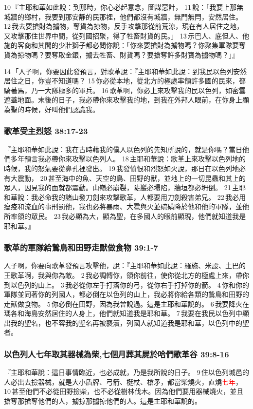 10 『主耶和華如此說：到那時，你心必起意念，圖謀惡計， 11 說：「我要上那無城牆的鄉村，我要到那安靜的民那裡，他們都沒有城牆，無門無閂，安然居住。 12 我去要搶財為擄物，奪貨為掠物，反手攻擊那從前荒涼，現在有人居住之地，又攻擊那住世界中間，從列國招聚，得了牲畜財貨的民。」 13 示巴人、底但人、他施的客商和其間的少壯獅子都必問你說：「你來要搶財為擄物嗎？你聚集軍隊要奪貨為掠物嗎？要奪取金銀，擄去牲畜、財貨嗎？要搶奪許多財寶為擄物嗎？」』

14 「人子啊，你要因此發預言，對歌革說：『主耶和華如此說：到我民以色列安然居住之日，你豈不知道嗎？ 15 你必從本地，從北方的極處率領許多國的民來，都騎著馬，乃一大隊極多的軍兵。 16 歌革啊，你必上來攻擊我的民以色列，如密雲遮蓋地面。末後的日子，我必帶你來攻擊我的地，到我在外邦人眼前，在你身上顯為聖的時候，好叫他們認識我。

\subsubsection{歌革受主烈怒 38:17-23}
『主耶和華如此說：我在古時藉我的僕人以色列的先知所說的，就是你嗎？當日他們多年預言我必帶你來攻擊以色列人。 18 主耶和華說：歌革上來攻擊以色列地的時候，我的怒氣要從鼻孔裡發出。 19 我發憤恨和烈怒如火說，那日在以色列地必有大震動， 20 甚至海中的魚、天空的鳥、田野的獸，並地上的一切昆蟲和其上的眾人，因見我的面就都震動。山嶺必崩裂，陡巖必塌陷，牆垣都必坍倒。 21 主耶和華說：我必命我的諸山發刀劍來攻擊歌革，人都要用刀劍殺害弟兄。 22 我必用瘟疫和流血的事刑罰他，我也必將暴雨、大雹與火並硫磺降於他和他的軍隊，並他所率領的眾民。 23 我必顯為大，顯為聖，在多國人的眼前顯現，他們就知道我是耶和華。』


\subsubsection{歌革的軍隊給鷙鳥和田野走獸做食物 39:1-7}
人子啊，你要向歌革發預言攻擊他，說：『主耶和華如此說：羅施、米設、土巴的王歌革啊，我與你為敵。 2 我必調轉你，領你前往，使你從北方的極處上來，帶你到以色列的山上。 3 我必從你左手打落你的弓，從你右手打掉你的箭。 4 你和你的軍隊並同著你的列國人，都必倒在以色列的山上，我必將你給各類的鷙鳥和田野的走獸做食物。 5 你必倒在田野，因為我曾說過。這是主耶和華說的。 6 我要降火在瑪各和海島安然居住的人身上，他們就知道我是耶和華。 7 我要在我民以色列中顯出我的聖名，也不容我的聖名再被褻瀆，列國人就知道我是耶和華，以色列中的聖者。

\subsubsection{以色列人七年取其器械為柴,七個月葬其屍於哈們歌革谷 39:8-16}
『主耶和華說：這日事情臨近，也必成就，乃是我所說的日子。 9 住以色列城邑的人必出去撿器械，就是大小盾牌、弓箭、梃杖、槍矛，都當柴燒火，直燒\textcolor{red}{七年}， 10 甚至他們不必從田野撿柴，也不必從樹林伐木。因為他們要用器械燒火，並且搶奪那搶奪他們的人，擄掠那擄掠他們的人。這是主耶和華說的。

